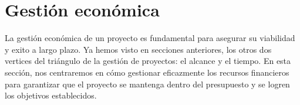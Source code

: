 \section{Gestión económica}

La gestión económica de un proyecto es fundamental para asegurar su viabilidad y exito a largo plazo. Ya hemos visto en secciones anteriores, los otros dos vertices 
del triángulo de la gestión de proyectos: el alcance y el tiempo. En esta sección, nos centraremos en cómo gestionar eficazmente los recursos financieros para garantizar
que el proyecto se mantenga dentro del presupuesto y se logren los objetivos establecidos. 













